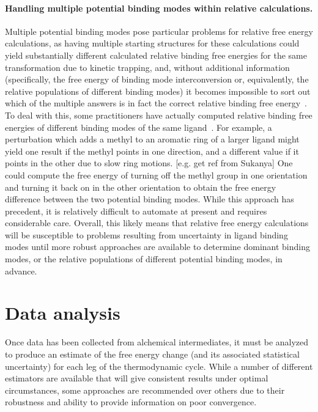 \documentclass[9pt,bestpractices]{livecoms}
\begin{document}
\paragraph{Handling multiple potential binding modes within relative calculations.}
Multiple potential binding modes pose particular problems for relative free energy calculations, as having multiple starting structures for these calculations could yield substantially different calculated relative binding free energies for the same transformation due to kinetic trapping, and, without additional information (specifically, the free energy of binding mode interconversion or, equivalently, the relative populations of different binding modes) it becomes impossible to sort out which of the multiple answers is in fact the correct relative binding free energy~\cite{}.
%
To deal with this, some practitioners have actually computed relative binding free energies of different binding modes of the same ligand~\cite{palma2012computation}.
For example, a perturbation which adds a methyl to an aromatic ring of a larger ligand might yield one result if the methyl points in one direction, and a different value if it points in the other due to slow ring motions. [e.g. get ref from Sukanya]
One could compute the free energy of turning off the methyl group in one orientation and turning it back on in the other orientation to obtain the free energy difference between the two potential binding modes.
While this approach has precedent, it is relatively difficult to automate at present and requires considerable care.
%
Overall, this likely means that relative free energy calculations will be susceptible to problems resulting from uncertainty in ligand binding modes until more robust approaches are available to determine dominant binding modes, or the relative populations of different potential binding modes, in advance.
%
\section{Data analysis}
\label{sec:data_analysis}
Once data has been collected from alchemical intermediates, it must be analyzed to produce an estimate of the free energy change (and its associated statistical uncertainty) for each leg of the thermodynamic cycle.
While a number of different estimators are available that will give consistent results under optimal circumstances, some approaches are recommended over others due to their robustness and ability to provide information on poor convergence.
%
\end{document}
